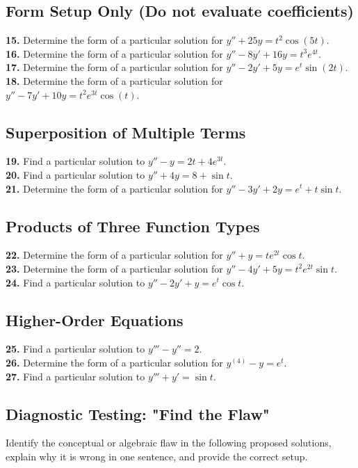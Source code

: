 \documentclass[11pt]{article}
\begin{document}
\subsection*{Form Setup Only (Do not evaluate coefficients)}
\textbf{15.} Determine the form of a particular solution for $y'' + 25y = t^2 \cos(5t)$. \\
\textbf{16.} Determine the form of a particular solution for $y'' - 8y' + 16y = t^3 e^{4t}$. \\
\textbf{17.} Determine the form of a particular solution for $y'' - 2y' + 5y = e^t \sin(2t)$. \\
\textbf{18.} Determine the form of a particular solution for $y'' - 7y' + 10y = t^2 e^{3t} \cos(t)$.

\subsection*{Superposition of Multiple Terms}
\textbf{19.} Find a particular solution to $y'' - y = 2t + 4e^{3t}$. \\
\textbf{20.} Find a particular solution to $y'' + 4y = 8 + \sin t$. \\
\textbf{21.} Determine the form of a particular solution for $y'' - 3y' + 2y = e^t + t\sin t$.

\subsection*{Products of Three Function Types}
\textbf{22.} Determine the form of a particular solution for $y'' + y = t e^{2t} \cos t$. \\
\textbf{23.} Determine the form of a particular solution for $y'' - 4y' + 5y = t^2 e^{2t} \sin t$. \\
\textbf{24.} Find a particular solution to $y'' - 2y' + y = e^t \cos t$.

\subsection*{Higher-Order Equations}
\textbf{25.} Find a particular solution to $y''' - y'' = 2$. \\
\textbf{26.} Determine the form of a particular solution for $y^{(4)} - y = e^t$. \\
\textbf{27.} Find a particular solution to $y''' + y' = \sin t$.

\subsection*{Diagnostic Testing: "Find the Flaw"}
Identify the conceptual or algebraic flaw in the following proposed solutions, explain why it is wrong in one sentence, and provide the correct setup. \\
\end{document}
